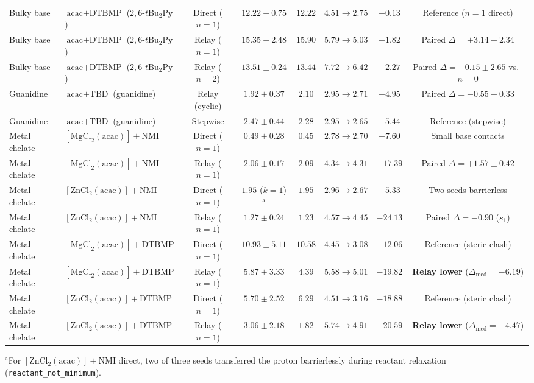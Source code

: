 \documentclass[11pt,a4paper]{article}
\begin{document}
\begin{table}[htbp]
{\begin{tabular}{@{}llcccccc@{}}
Bulky base & $\text{acac} + \text{DTBMP}$ ($2,6\text{-}t\text{Bu}_2\text{Py}$) & Direct ($n=1$) & $12.22 \pm 0.75$ & $12.22$ & $4.51 \to 2.75$ & $+0.13$ & Reference ($n=1$ direct) \\
Bulky base & $\text{acac} + \text{DTBMP}$ ($2,6\text{-}t\text{Bu}_2\text{Py}$) & Relay ($n=1$) & $15.35 \pm 2.48$ & $15.90$ & $5.79 \to 5.03$ & $+1.82$ & Paired $\Delta = +3.14 \pm 2.34$ \\
Bulky base & $\text{acac} + \text{DTBMP}$ ($2,6\text{-}t\text{Bu}_2\text{Py}$) & Relay ($n=2$) & $13.51 \pm 0.24$ & $13.44$ & $7.72 \to 6.42$ & $-2.27$ & Paired $\Delta = -0.15 \pm 2.65$ vs.\ $n=0$ \\
\midrule
Guanidine & $\text{acac} + \text{TBD}$ (guanidine) & Relay (cyclic) & $\mathbf{1.92 \pm 0.37}$ & $\mathbf{2.10}$ & $2.95 \to 2.71$ & $-4.95$ & Paired $\Delta = -0.55 \pm 0.33$ \\
Guanidine & $\text{acac} + \text{TBD}$ (guanidine) & Stepwise & $2.47 \pm 0.44$ & $2.28$ & $2.95 \to 2.65$ & $-5.44$ & Reference (stepwise) \\
\midrule
Metal chelate & $[\text{MgCl}_2(\text{acac})] + \text{NMI}$ & Direct ($n=1$) & $0.49 \pm 0.28$ & $0.45$ & $2.78 \to 2.70$ & $-7.60$ & Small base contacts \\
Metal chelate & $[\text{MgCl}_2(\text{acac})] + \text{NMI}$ & Relay ($n=1$) & $2.06 \pm 0.17$ & $2.09$ & $4.34 \to 4.31$ & $-17.39$ & Paired $\Delta = +1.57 \pm 0.42$ \\
Metal chelate & $[\text{ZnCl}_2(\text{acac})] + \text{NMI}$ & Direct ($n=1$) & $1.95$ ($k=1$)$^{\text{a}}$ & $1.95$ & $2.96 \to 2.67$ & $-5.33$ & Two seeds barrierless \\
Metal chelate & $[\text{ZnCl}_2(\text{acac})] + \text{NMI}$ & Relay ($n=1$) & $\mathbf{1.27 \pm 0.24}$ & $\mathbf{1.23}$ & $4.57 \to 4.45$ & $-24.13$ & Paired $\Delta = -0.90$ ($s_1$) \\
Metal chelate & $[\text{MgCl}_2(\text{acac})] + \text{DTBMP}$ & Direct ($n=1$) & $10.93 \pm 5.11$ & $10.58$ & $4.45 \to 3.08$ & $-12.06$ & Reference (steric clash) \\
Metal chelate & $[\text{MgCl}_2(\text{acac})] + \text{DTBMP}$ & Relay ($n=1$) & $\mathbf{5.87 \pm 3.33}$ & $\mathbf{4.39}$ & $5.58 \to 5.01$ & $-19.82$ & \textbf{Relay lower} ($\Delta_{\text{med}} = -6.19$) \\
Metal chelate & $[\text{ZnCl}_2(\text{acac})] + \text{DTBMP}$ & Direct ($n=1$) & $5.70 \pm 2.52$ & $6.29$ & $4.51 \to 3.16$ & $-18.88$ & Reference (steric clash) \\
Metal chelate & $[\text{ZnCl}_2(\text{acac})] + \text{DTBMP}$ & Relay ($n=1$) & $\mathbf{3.06 \pm 2.18}$ & $\mathbf{1.82}$ & $5.74 \to 4.91$ & $-20.59$ & \textbf{Relay lower} ($\Delta_{\text{med}} = -4.47$) \\
\bottomrule
\end{tabular}}
\begin{flushleft}
\footnotesize $^{\text{a}}$For $[\text{ZnCl}_2(\text{acac})] + \text{NMI}$ direct, two of three seeds transferred the proton barrierlessly during reactant relaxation (\texttt{reactant\_not\_minimum}).
\end{flushleft}
\end{table}
\end{document}
